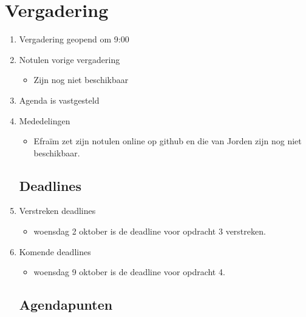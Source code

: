 \documentclass{article}
\begin{document}
\section*{Vergadering}
\begin{enumerate}
	
	\subsection*{Vooraf}
	\item Vergadering geopend om 9:00%
	\item Notulen vorige vergadering
	\begin{itemize}
		\item Zijn nog niet beschikbaar
	\end{itemize}
	\item Agenda is vastgesteld
	\item Mededelingen
	\begin{itemize}
		\item Efraïm zet zijn notulen online op github en die van Jorden zijn nog niet beschikbaar.
	\end{itemize}

	\subsection*{Deadlines}
	\item Verstreken deadlines
	\begin{itemize}
		\item woensdag 2 oktober is de deadline voor opdracht 3 verstreken.
	\end{itemize}
	\item Komende deadlines
	\begin{itemize}
		\item woensdag 9 oktober is de deadline voor opdracht 4.
	\end{itemize}

	\subsection*{Agendapunten}
	

\end{enumerate}
\end{document}
